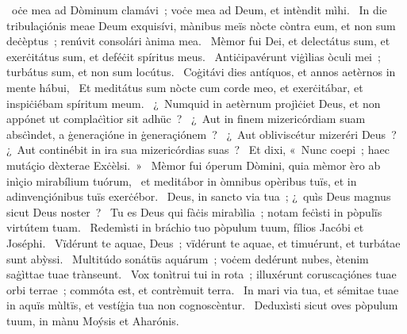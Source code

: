 { }
{%
~oċe mea ad Dòminum clamávi~; voċe mea ad Deum, et intèndit mìhi. 
~In die tribulaçiónis meae Deum exquisívi, mànibus meïs nòcte còntra eum, et non sum deċèptus~; renúvit consolári ànima mea. 
~Mèmor fui Dei, et delectátus sum, et exerċitátus sum, et deféċit spíritus meus. 
~Antiċipavérunt viġìlias òculi mei~; turbátus sum, et non sum locútus. 
~Coġitávi dies antíquos, et annos aetèrnos in mente hábui, 
~Et meditátus sum nòcte cum corde meo, et exerċitábar, et inspiċiébam spíritum meum. 
~¿~Numquid in aetèrnum projìċiet Deus, et non appónet ut complaċìtior sit adhüc~? 
~¿~Aut in finem mizericórdiam suam absċìndet, a ġeneraçióne in ġeneraçiónem~? 
~¿~Aut obliviscétur mizeréri Deus~? ¿~Aut continébit in ira sua mizericórdias suas~? 
~Et dixi, «~Nunc coepi~; haec mutáçio dèxterae Exċèlsi.~»
~Mèmor fui óperum Dòmini, quia mèmor èro ab inìçio mirabílium tuórum, 
~et meditábor in òmnibus opèribus tuïs, et in adinvençiónibus tuïs exerċébor. 
~Deus, in sancto via tua~; ¿~quìs Deus magnus sicut Deus noster~? 
~Tu es Deus qui fàċis mirabìlia~; notam feċìsti in pòpulïs virtútem tuam. 
~Redemìsti in bráchio tuo pòpulum tuum, fílios Jacóbi et Joséphi. 
~Vïdérunt te aquae, Deus~; vïdérunt te aquae, et timuérunt, et turbátae sunt abỳssi. 
~Multitúdo sonátüs aquárum~; voċem dedérunt nubes, ètenim saġìttae tuae trànseunt. 
~Vox tonìtrui tui in rota~; illuxérunt coruscaçiónes tuae orbi terrae~; commóta est, et contrèmuit terra. 
~In mari via tua, et sémitae tuae in aquïs mùltïs, et vestíġia tua non cognoscèntur. 
~Deduxìsti sicut oves pòpulum tuum, in mànu Moýsis et Aharónis. 
}
